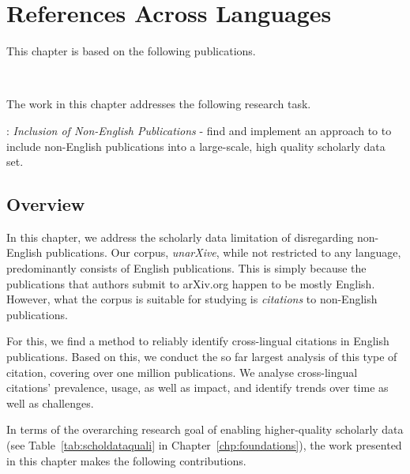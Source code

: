 \chapter{References Across Languages}
\label{chp:xling}

This chapter is based on the following publications.
\begin{infobox-pub}
\\
\end{infobox-pub}

\begin{infobox-pub}
\end{infobox-pub}

The work in this chapter addresses the following research task.

\begin{rtlist}
    \item[\rtmark{3}:] \textit{Inclusion of Non-English Publications} - find and implement an approach to to include non-English publications into a large-scale, high quality scholarly data set.
\end{rtlist}

\section{Overview}
In this chapter, we address the scholarly data limitation of disregarding non-English publications. Our corpus, \emph{unarXive}, while not restricted to any language, predominantly consists of English publications. This is simply because the publications that authors submit to arXiv.org happen to be mostly English. However, what the corpus is suitable for studying is \emph{citations} to non-English publications.

For this, we find a method to reliably identify cross-lingual citations in English publications. Based on this, we conduct the so far largest analysis of this type of citation, covering over one million publications. We analyse cross-lingual citations' prevalence, usage, as well as impact, and identify trends over time as well as challenges.

In terms of the overarching research goal of enabling higher-quality scholarly data (see Table~\ref{tab:scholdataquali} in Chapter~\ref{chp:foundations}), the work presented in this chapter makes the following contributions.

